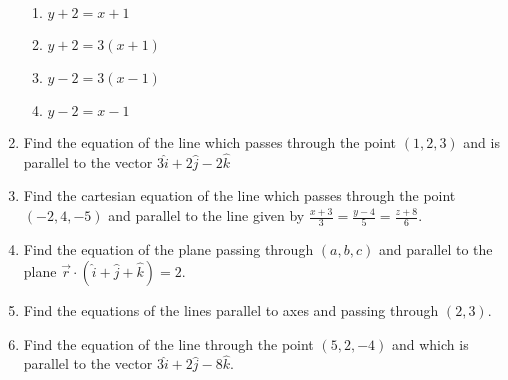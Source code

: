 \begin{enumerate}[label=\thesubsection.\arabic*, ref=\thesubsection.\theenumi]
\begin{enumerate}
\item $y+2=x+1$
\item $y+2=3(x+1)$
\item $y-2=3(x-1)$
\item $y-2=x-1$
\end{enumerate}
\item  Find the equation of the line which passes through the point $(1, 2, 3)$ and is parallel to the vector $3\hat{i}+2\hat{j}-2\hat{k}$
\item Find the cartesian equation of the line which passes through the point $(-2, 4, -5)$ and parallel to the line given by $ \frac{x+3}{3}=\frac{y-4}{5}=\frac{z+8}{6}$.
\item Find the equation of the plane passing through $(a, b, c)$ and parallel to the plane $\overrightarrow{r} \cdot (\hat{i}+\hat{j}+\hat{k})=2$.
\item Find the equations of the lines parallel to axes and passing through $(2,3)$.
\item Find the equation of the line through the point $(5, 2, -4)$ and which is parallel to the vector $3 \hat{i}+2 \hat{j}- 8 \hat{k}$.
\end{enumerate}
